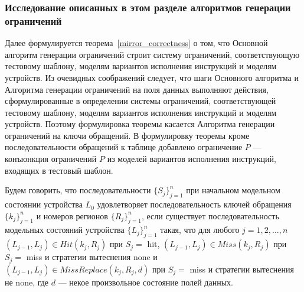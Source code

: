 \subsubsection*{Исследование описанных в этом разделе алгоритмов генерации ограничений}

Далее формулируется теорема~\ref{mirror_correctness} о том, что Основной алгоритм генерации ограничений строит систему ограничений, соответствующую тестовому шаблону, моделям вариантов исполнения инструкций и моделям устройств. Из очевидных соображений следует, что шаги Основного алгоритма и Алгоритма генерации ограничений на поля данных выполняют действия, сформулированные в определении системы ограничений, соответствующей тестовому шаблону, моделям вариантов исполнения инструкций и моделям устройств. Поэтому формулировка теоремы касается Алгоритма генерации ограничений на ключи обращений. В формулировку теоремы кроме последовательности обращений к таблице добавлено ограничение $P$ --- конъюнкция ограничений $P$ из моделей вариантов исполнения инструкций, входящих в тестовый шаблон.

Будем говорить, что последовательности $\{S_j\}_{j=1}^n$ при начальном модельном состоянии устройства $L_0$ удовлетворяет последовательность ключей обращения $\{k_j\}_{j=1}^n$ и номеров регионов $\{R_j\}_{j=1}^n$, если существует последовательность модельных состояний устройства $\{L_j\}_{j=1}^n$ такая, что для любого $j = 1, 2, ..., n$ $(L_{j-1}, L_j) \in Hit(k_j, R_j)$ при $S_j =$ hit, $(L_{j-1}, L_j) \in Miss(k_j, R_j)$ при $S_j =$ miss и стратегии вытеснения none и $(L_{j-1}, L_j) \in MissReplace(k_j, R_j, d)$ при $S_j =$ miss и стратегии вытеснения не none, где $d$ --- некое произвольное состояние полей данных.

